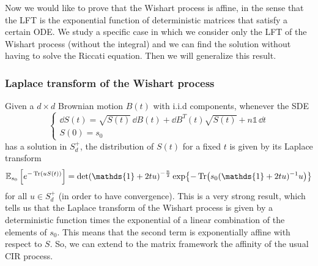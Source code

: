  Now we would like to prove that the Wishart process is affine, in the sense that the LFT is the exponential function of deterministic matrices that satisfy a certain ODE. We study a specific case in which we consider only the LFT of the Wishart process (without the integral) and we can find the solution without having to solve the Riccati equation. Then we will generalize this result.\\

\subsubsection{Laplace transform of the Wishart process}
Given a $d\times d$ Brownian motion $B(t)$ with i.i.d components, whenever the SDE
\begin{equation}
    \begin{cases}
    \dd S(t) = \sqrt{S(t)}\,\dd B(t) + \dd B^T(t)\sqrt{S(t)} + n\mathds{1}\,\dd t \\
    S(0) = s_0
    \end{cases}
\end{equation}
has a solution in $S_d^+$, the distribution of $S(t)$ for a fixed $t$ is given by its Laplace transform
\begin{equation}\label{lapltrWis}
    \mathbb{E}_{s_0}\left[e^{-\Tr(uS(t))}\right] = \det(\mathds{1}+2tu)^{-\frac{n}{2}}\exp{-\Tr(s_0(\mathds{1}+2tu)^{-1}u)}
\end{equation}
for all $u\in S_d^+$ (in order to have convergence). This is a very strong result, which tells us that the Laplace transform of the Wishart process is given by a deterministic function times the exponential of a linear combination of the elements of $s_0$. This means that the second term is exponentially affine with respect to $S$. So, we can extend to the matrix framework the affinity of the usual CIR process.
